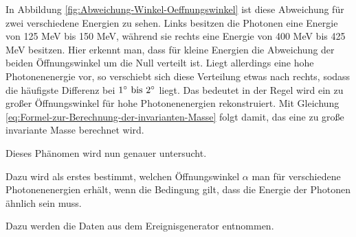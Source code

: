 \documentclass[a4paper,11pt,oneside,final,german,openbib,pdftex]{scrbook}
\begin{document}
{In Abbildung \ref{fig:Abweichung-Winkel-Oeffnungswinkel} ist diese Abweichung f\"ur zwei verschiedene Energien zu sehen. Links besitzen die Photonen eine Energie von 125 MeV bis 150 MeV, w\"ahrend sie rechts eine Energie von 400 MeV bis 425 MeV besitzen. Hier erkennt man, dass f\"ur kleine Energien die Abweichung der beiden \"Offnungswinkel um die Null verteilt ist. Liegt allerdings eine hohe Photonenenergie vor, so verschiebt sich diese Verteilung etwas nach rechts, sodass die h\"aufigste Differenz bei $1^{\circ} \textnormal{ bis } 2^{\circ}$ liegt. Das bedeutet in der Regel wird ein zu gro{\ss}er \"Offnungswinkel f\"ur hohe Photonenenergien rekonstruiert.
Mit Gleichung \ref{eq:Formel-zur-Berechnung-der-invarianten-Masse} folgt damit, das eine zu gro{\ss}e invariante Masse berechnet wird.
 
 Dieses Ph\"anomen wird nun genauer untersucht.

Dazu wird als erstes bestimmt, welchen \"Offnungswinkel $\alpha$ man f\"ur verschiedene Photonenenergien erh\"alt, wenn die Bedingung gilt, dass die Energie der Photonen \"ahnlich sein muss.

Dazu werden die Daten aus dem Ereignisgenerator entnommen.


}
\end{document}

